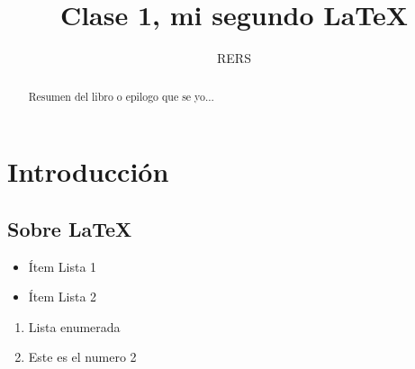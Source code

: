 \documentclass[letterpaper,11pt]{report}
\title{Clase 1, mi segundo \LaTeX }
\author{RERS}
\begin{document}
\maketitle

\begin{abstract}
Resumen del libro o epilogo que se yo...
\end{abstract} 
\newpage

\tableofcontents
\newpage

\chapter{Introducción}
\section{Sobre \LaTeX}
\lipsum 
\begin{itemize}
\item Ítem Lista 1
\item Ítem Lista 2
\end{itemize}
\begin{enumerate}
\item Lista enumerada
\item Este es el numero 2
\end{enumerate}
\end{document}
